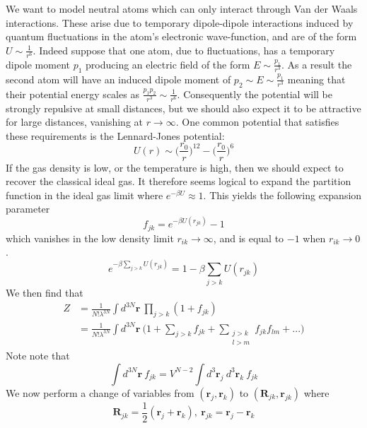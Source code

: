 \documentclass[a4paper,11pt,oneside]{book}
\begin{document}
We want to model neutral atoms which can only interact through Van der Waals interactions. These arise due to temporary dipole-dipole interactions induced by quantum fluctuations in the atom's electronic wave-function, and are of the form $U \sim \frac{1}{r^6}$. Indeed suppose that one atom, due to fluctuations, has a temporary dipole moment $p_1$ producing an electric field of the form $E\sim \frac{p_1}{r^3}$. As a result the second atom will have an induced dipole moment of $p_2 \sim E \sim \frac{p_1}{r^3}$ meaning that their potential energy scales as $\frac{p_1p_2}{r^3} \sim \frac{1}{r^6}$. Consequently the potential will be strongly repulsive at small distances, but we should also expect it to be attractive for large distances, vanishing at $r \rightarrow \infty$. One common potential that satisfies these requirements is the Lennard-Jones potential:
\begin{equation}
    U(r) \sim \bigg(\frac{r_0}{r}\bigg)^12-\bigg(\frac{r_0}{r}\bigg)^6
\end{equation}
If the gas density is low, or the temperature is high, then we should expect to recover the classical ideal gas. It therefore seems logical to expand the partition function in the ideal gas limit where $e^{-\beta U} \approx 1$. This yields the following expansion parameter
\begin{equation}
    f_{jk} = e^{-\beta U(r_{jk})}-1
\end{equation}
which vanishes in the low density limit $r_{ik}\rightarrow \infty$, and is equal to $-1$ when $r_{ik}\rightarrow 0$.
\begin{equation}
    e^{-\beta \sum_{j>k} U(r_{jk})}  = 1-\beta \sum_{j>k} U(r_{jk})
\end{equation}
We then find that
\begin{align}
    Z &= \frac{1}{N!\lambda^{3N}} \int d^{3N}\textbf{r} \  \prod_{j>k}(1+f_{jk})\\
    &=\frac{1}{N!\lambda^{3N}} \int d^{3N}\textbf{r} \  \bigg(1+\sum_{j>k}f_{jk}+\sum_{\substack{j>k\\l>m}} f_{jk}f_{lm}+...\bigg)\label{cluster}
\end{align}
Note note that
\begin{equation}
    \int d^{3N}\textbf{r}\ f_{jk} = V^{N-2} \int d^3\textbf{r}_j \  d^3\textbf{r}_k \ f_{jk}
\end{equation}
We now perform a change of variables from $(\textbf{r}_j,\textbf{r}_k)$ to $(\textbf{R}_{jk},\textbf{r}_{jk})$ where
\begin{equation}
    \textbf{R}_{jk} = \frac{1}{2}(\textbf{r}_j+\textbf{r}_k), \ \textbf{r}_{jk} =\textbf{r}_j-\textbf{r}_k
\end{equation}
\end{document}
